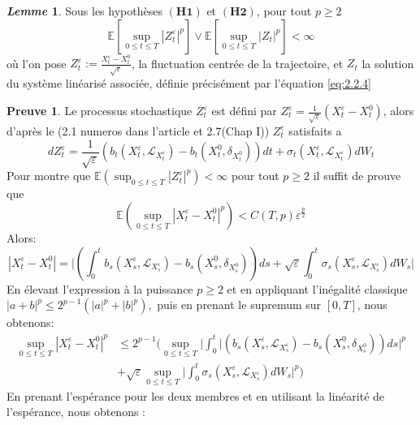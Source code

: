 \documentclass[12pt,a4paper,twoside,fleqn]{book}%
\theoremstyle{definition}
\newtheorem*{pr}{\textbf{Preuve}}
\theoremstyle{lemme}
\newtheorem{lem}[dfn]{\textit{Lemme}}
\numberwithin{equation}{section}
\begin{document}
\begin{lem}\label{lem:2.2.4}
	Sous les hypothèses $(\textbf{H1})$ et $(\textbf{H2})$, pour tout $p\geq2$
		\begin{equation}\label{eq:2.2.23}
		\mathbb{E}\left[\sup_{0\leq t \leq T}|Z_t^\varepsilon|^p\right] \vee \mathbb{E}\left[\sup_{0\leq t \leq T}|Z_t|^p\right]<\infty
	\end{equation}
	où l'on pose $Z_t^\varepsilon:=\frac{X_t^\varepsilon-X_t^0}{\sqrt{\varepsilon}}$, la fluctuation centrée de la trajectoire, et $Z_t$ la solution du système linéarisé associée, définie précisément par l'équation \ref{eq:2.2.4}
\end{lem}
\begin{pr}
Le processus stochastique $Z_t^\varepsilon$ est défini par $Z_t^\varepsilon=\frac{1}{\sqrt{\varepsilon}}(X_t^\varepsilon-X_t^0)$, alors d'après le (2.1 numeros dans l'article et 2.7(Chap I)) $Z_t^\varepsilon$ satisfaits a
\[
dZ_t^\varepsilon = \frac{1}{\sqrt{\varepsilon}}\left(b_t(X_t^\varepsilon,\mathcal{L}_{X_t^\varepsilon})-b_t(X_t^0,\delta_{X_t^0})\right)dt+\sigma_t(X_t^\varepsilon,\mathcal{L}_{X_t^\varepsilon})dW_t
\]
Pour montre que $\mathbb{E}\left(\sup_{0\leq t \leq T}|Z_t^\varepsilon|^p\right)<\infty$ pour tout $p\geq 2$ il suffit de prouve que 
\begin{equation}\label{eq:2.2.24}
\mathbb{E}\left( \sup_{0\leq t \leq T}|X_t^\varepsilon-X_t^0|^p \right)<C(T,p)\varepsilon^{\frac{p}{2}}
\end{equation}
Alors:
 \[
 |X_t^\varepsilon - X_t^0| = \Big|\left(\int_{0}^{t}b_s(X_s^\varepsilon,\mathcal{L}_{X_s^\varepsilon}) - b_s(X_s^0,\delta_{X_s^0})\right)ds + \sqrt{\varepsilon}\int_{0}^{t}\sigma_s(X_s^\varepsilon,\mathcal{L}_{X_s^\varepsilon})dW_s\Big|
 \]
En élevant l'expression à la puissance $p\geq 2$ et en appliquant l'inégalité classique $ |a+b|^p \leq 2^{p-1}(|a|^p + |b|^p),$ puis en prenant le supremum sur $[0,T]$, nous obtenons:
\[
\begin{aligned}
\sup_{0\leq t \leq T} |X_t^\varepsilon - X_t^0|^p &\leq 2^{p-1}\Big( \sup_{0\leq t \leq T}\Big|\int_{0}^{t}\Big|\left(b_s(X_s^\varepsilon,\mathcal{L}_{X_s^\varepsilon}) - b_s(X_s^0,\delta_{X_s^0})\right)ds\Big|^p\\&+\sqrt{\varepsilon}\sup_{0\leq t \leq T}\Big|\int_{0}^{t}\sigma_s(X_s^\varepsilon,\mathcal{L}_{X_s^\varepsilon})dW_s\Big|^p \Big)
\end{aligned}
\]
En prenant l’espérance pour les deux membres et en utilisant la linéarité de l’espérance, nous obtenons :
\begin{equation}\label{eq:2.2.25}

\end{equation}
\end{pr}
\end{document}
